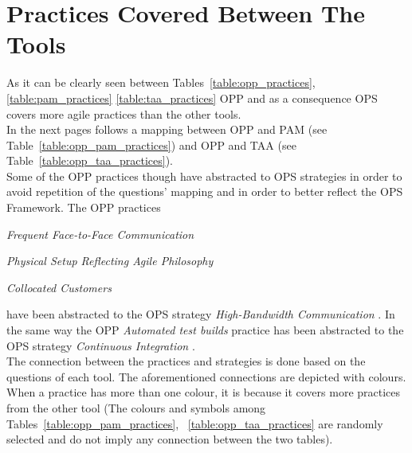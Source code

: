 \section{Practices Covered Between The Tools}

As it can be clearly seen between Tables~\ref{table:opp_practices}, \ref{table:pam_practices} \ref{table:taa_practices} OPP and as a consequence OPS covers more agile practices than the other tools. \\

In the next pages follows a mapping between OPP and PAM (see Table~\ref{table:opp_pam_practices}) and OPP and TAA (see Table~\ref{table:opp_taa_practices}). \\

Some of the OPP practices though have abstracted to OPS strategies in order to avoid repetition of the questions' mapping and in order to better reflect the OPS Framework. The OPP practices \begin{inparaenum} [a\upshape)]
	\item \textit{Frequent Face-to-Face Communication}
	\item \textit{Physical Setup Reflecting Agile Philosophy}
	\item \textit{Collocated Customers}
\end{inparaenum} have been abstracted to the OPS strategy \textit{High-Bandwidth Communication}  \cite[p. 57]{sventha_dissertation}. In the same way the OPP \textit{Automated test builds} practice has been abstracted to the OPS strategy \textit{Continuous Integration} \cite[p. 57]{sventha_dissertation}. \\

The connection between the practices and strategies is done based on the questions of each tool. The aforementioned connections are depicted with colours. When a practice has more than one colour, it is because it covers more practices from the other tool {\footnotesize (The colours and symbols among Tables~\ref{table:opp_pam_practices}, ~\ref{table:opp_taa_practices} are randomly selected and do not imply any connection between the two tables)}. \\


